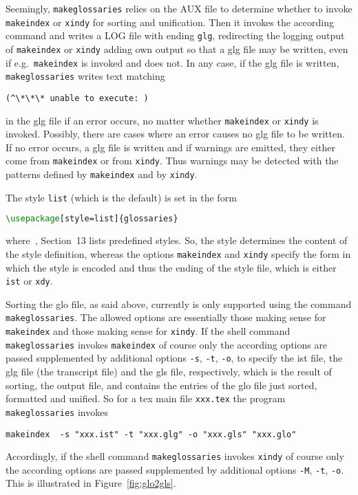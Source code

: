 Seemingly, \texttt{makeglossaries} relies on the AUX file 
to determine whether to invoke \texttt{makeindex} or \texttt{xindy} 
for sorting and unification. 
Then it invokes the according command and writes a LOG file 
with ending \texttt{glg}, 
redirecting the logging output of \texttt{makeindex} or \texttt{xindy} 
adding own output so that a glg file may be written, 
even if e.g.~\texttt{makeindex} is invoked and does not. 
In any case, if the glg file is written, 
\texttt{makeglossaries} writes text matching 
%
\begin{verbatim}
(^\*\*\* unable to execute: )
\end{verbatim}
%
in the glg file if an error occurs, 
no matter whether \texttt{makeindex} or \texttt{xindy} is invoked. 
Possibly, there are cases where an error causes no glg file to be written. 
If no error occurs, a glg file is written 
and if warnings are emitted, 
they either come from \texttt{makeindex} or from \texttt{xindy}. 
Thus warnings may be detected with the patterns 
defined by \texttt{makeindex} and by \texttt{xindy}. 

The style \texttt{list} (which is the default) is set in the form 
%
\begin{lstlisting}[language=TeX]
\usepackage[style=list]{glossaries}
\end{lstlisting}
%
where~\cite{GloP4_54}, Section~13 lists predefined styles. 
So, the style determines the content of the style definition, 
whereas the options \texttt{makeindex} and \texttt{xindy} 
specify the form in which the style is encoded 
and thus the ending of the style file, 
which is either \texttt{ist} or \texttt{xdy}. 

Sorting the glo file, as said above, 
currently is only supported using the command \texttt{makeglossaries}. 
The allowed options are essentially those 
making sense for \texttt{makeindex} and those making sense for \texttt{xindy}. 
If the shell command \texttt{makeglossaries} 
invokes \texttt{makeindex} of course only the according options 
are passed supplemented by additional options 
\texttt{-s}, \texttt{-t}, \texttt{-o}, to specify the
ist file, the glg file (the transcript file) and the gls file,
respectively, 
which is the result of sorting, the output file, 
and contains the entries of the glo file 
just sorted, formatted and unified.
So for a tex main file \texttt{xxx.tex} the program 
\texttt{makeglossaries} invokes
%
\begin{verbatim}
makeindex  -s "xxx.ist" -t "xxx.glg" -o "xxx.gls" "xxx.glo"
\end{verbatim}
%
Accordingly, if the shell command \texttt{makeglossaries} 
invokes \texttt{xindy} of course only the according options 
are passed supplemented by additional options 
\texttt{-M}, \texttt{-t}, \texttt{-o}. 
This is illustrated in Figure~\ref{fig:glo2gls}. 


